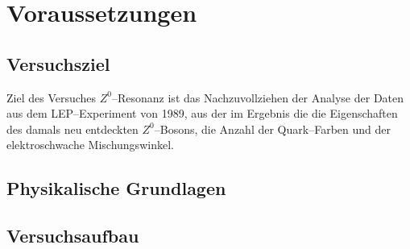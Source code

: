\section{Voraussetzungen}

\subsection{Versuchsziel}

Ziel des Versuches $Z^0$–Resonanz ist das Nachzuvollziehen der Analyse der Daten
aus dem LEP–Experiment von 1989, aus der im Ergebnis die die Eigenschaften des
damals neu entdeckten $Z^0$–Bosons, die Anzahl der Quark–Farben und der
elektroschwache Mischungswinkel.

\subsection{Physikalische Grundlagen}

\subsection{Versuchsaufbau}
